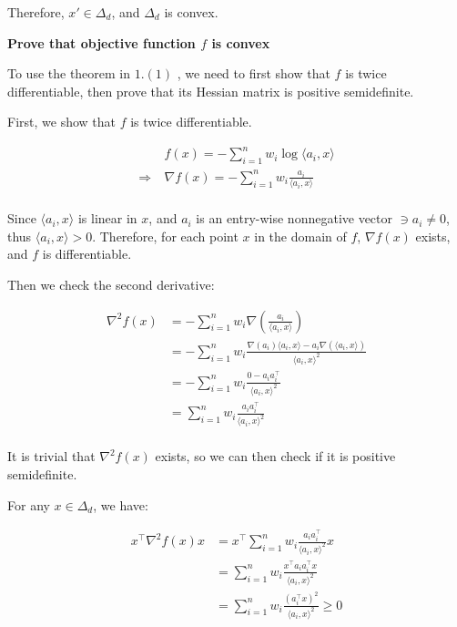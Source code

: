 \documentclass{article}
\begin{document}
Therefore, $x' \in \Delta_d$, and $\Delta_d$ is convex.
\bigskip

\begin{center}
    \textbf{Prove that objective function $f$ is convex}
\end{center}

To use the theorem in $1. (1)$ , we need to first show that $f$ is twice differentiable,
then prove that its Hessian matrix is positive semidefinite.
\bigskip

First, we show that $f$ is twice differentiable.

\begin{align*}
    &f(x) = - \sum_{i = 1}^n w_i \log \langle a_i, x \rangle \\
    \Rightarrow \ & \nabla f(x) = -\sum_{i=1}^{n} w_i \frac{a_i}{\langle a_i, x \rangle} \\
\end{align*}

Since $\langle a_i, x \rangle$ is linear in $x$, 
and $a_i$ is an entry-wise nonnegative vector $\ni a_i \ne 0$,
thus $\langle a_i, x \rangle > 0$.
Therefore, for each point $x$ in the domain of $f$, $\nabla f(x)$ exists,
and $f$ is differentiable.
\bigskip

Then we check the second derivative:

\begin{align*}
    \nabla^2 f(x) 
    &= - \sum_{i=1}^{n} w_i \nabla \left( \frac{a_i}{\langle a_i, x \rangle} \right) \\
    &= - \sum_{i=1}^{n} w_i \frac{\nabla (a_i) \langle a_i, x \rangle - a_i \nabla (\langle a_i, x \rangle)}{\langle a_i, x \rangle^2} \\
    &= - \sum_{i=1}^{n} w_i \frac{0 - a_i a_i^\intercal}{\langle a_i, x \rangle^2} \\
    &= \sum_{i=1}^{n} w_i \frac{a_i a_i^\intercal}{\langle a_i, x \rangle^2} \\
\end{align*}

It is trivial that $\nabla^2 f(x)$ exists,
so we can then check if it is positive semidefinite.

For any $x \in \Delta_d$, we have:

\begin{align*}
    x^\intercal \nabla^2 f(x) x 
    &= x^\intercal \sum_{i=1}^{n} w_i \frac{a_i a_i^\intercal}{\langle a_i, x \rangle^2} x \\
    &= \sum_{i=1}^{n} w_i \frac{x^\intercal a_i a_i^\intercal x}{\langle a_i, x \rangle^2} \\
    &= \sum_{i=1}^{n} w_i \frac{(a_i^\intercal x)^2}{\langle a_i, x \rangle^2} \ge 0 \\
\end{align*}
\end{document}

